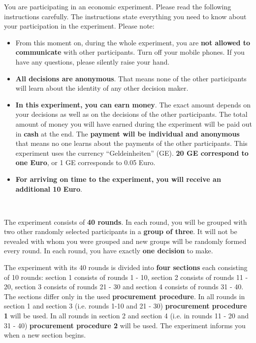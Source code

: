 \documentclass[11pt]{scrartcl}
\begin{document}
	


You are participating in an economic experiment. Please read the following instructions carefully. The instructions state everything you need to know about your participation in the experiment. \bigbreak
Please note:
\begin{itemize}
	\item From this moment on, during the whole experiment, you are \textbf{not allowed to communicate} with other participants. Turn off your mobile phones. If you have any questions, please silently raise your hand.
	\item \textbf{All decisions are anonymous}. That means none of the other participants will learn about the identity of any other decision maker.
	\item \textbf{In this experiment, you can earn money}. The exact amount depends on your decisions as well as on the decisions of the other participants. The total amount of money you will have earned during the experiment will be paid out in \textbf{cash} at the end. The \textbf{payment will be individual and anonymous} that means no one learns about the payments of the other participants. This experiment uses the currency \enquote{Geldeinheiten} (GE). \textbf{20 GE correspond to one Euro}, or 1 GE corresponds to 0.05 Euro.
	\item \textbf{For arriving on time to the experiment, you will receive an additional 10 Euro}.
\end{itemize}

~\par
		

The experiment consists of \textbf{40 rounds}. In each round, you will be grouped with two other randomly selected participants in a \textbf{group of three}. It will not be revealed with whom you were grouped and new groups will be randomly formed every round. In each round, you have exactly \textbf{one decision} to make.



The experiment with its 40 rounds is divided into \textbf{four sections} each consisting of 10 rounds: section 1 consists of rounds 1 - 10, section 2 consists of rounds 11 - 20, section 3 consists of rounds 21 - 30 and section 4 consists of rounds 31 - 40. ~\bigskip
The sections differ only in the used \textbf{procurement procedure}. In all rounds in section 1 and section 3 (i.e. rounds 1-10 and 21 - 30) \textbf{procurement procedure 1} will be used. In all rounds in section 2 and section 4 (i.e. in rounds 11 - 20 and 31 - 40) \textbf{procurement procedure 2} will be used. The experiment informs you when a new section begins.
\end{document}
